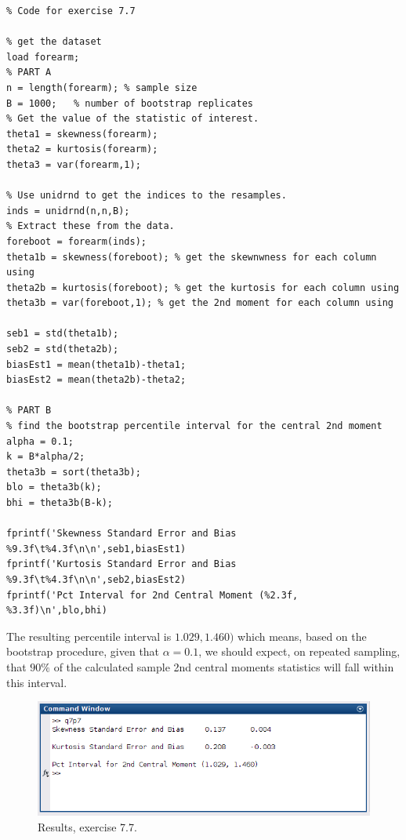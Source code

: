 \documentclass[12pt,a4paper]{article}
\begin{document}
\begin{verbatim}
% Code for exercise 7.7

% get the dataset
load forearm;
% PART A
n = length(forearm); % sample size
B = 1000;	% number of bootstrap replicates
% Get the value of the statistic of interest.
theta1 = skewness(forearm);
theta2 = kurtosis(forearm);
theta3 = var(forearm,1);

% Use unidrnd to get the indices to the resamples.
inds = unidrnd(n,n,B);
% Extract these from the data.
foreboot = forearm(inds);
theta1b = skewness(foreboot); % get the skewnwness for each column using
theta2b = kurtosis(foreboot); % get the kurtosis for each column using
theta3b = var(foreboot,1); % get the 2nd moment for each column using

seb1 = std(theta1b);
seb2 = std(theta2b);
biasEst1 = mean(theta1b)-theta1;
biasEst2 = mean(theta2b)-theta2;

% PART B
% find the bootstrap percentile interval for the central 2nd moment
alpha = 0.1;
k = B*alpha/2;
theta3b = sort(theta3b);
blo = theta3b(k);
bhi = theta3b(B-k);

fprintf('Skewness Standard Error and Bias %9.3f\t%4.3f\n\n',seb1,biasEst1)
fprintf('Kurtosis Standard Error and Bias %9.3f\t%4.3f\n\n',seb2,biasEst2)
fprintf('Pct Interval for 2nd Central Moment (%2.3f, %3.3f)\n',blo,bhi)
\end{verbatim}

The resulting percentile interval is $1.029, 1.460)$ which means, based on the bootstrap procedure, given that $\alpha=0.1$, we should expect, on repeated sampling, that $90\%$ of the calculated sample 2nd central moments statistics will fall within this interval.

\begin{figure}[ht!]
\begin{center}
\includegraphics[scale=.6]{q7p7_result.png}
\caption{Results, exercise 7.7.}
\label{q7p7 fig1}
\end{center}
\end{figure}
\FloatBarrier
\end{document}
